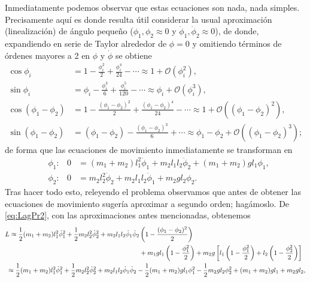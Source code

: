 \documentclass{article}
\begin{document}
Inmediatamente podemos observar que estas ecuaciones son nada, nada simples. Precisamente aqu\'i es donde resulta \'util considerar la usual aproximaci\'on (linealizaci\'on) de \'angulo peque\~no ($\phi_1,\phi_2\approx0$ y $\dot{\phi}_1,\dot{\phi}_2\approx0$), de donde, expandiendo en serie de Taylor alrededor de $\phi=0$ y omitiendo t\'erminos de \'ordenes mayores a 2 en $\phi$ y $\dot{\phi}$ se obtiene
\begin{align}
    \cos\phi_i &= 1-\frac{\phi^2_i}{2}+\frac{\phi^4_i}{24}-\cdots \approx 1 + \mathcal{O}(\phi_i^2), \nonumber \\
    \sin\phi_i &= \phi_i-\frac{\phi_i^3}{6}+\frac{\phi_i^5}{120}-\cdots \approx \phi_i + \mathcal{O}(\phi_i^3), \nonumber \\
    \cos(\phi_1-\phi_2)&=1-\frac{(\phi_1-\phi_2)^2}{2} + \frac{(\phi_1-\phi_2)^4}{24} - \cdots \approx 1 + \mathcal{O}((\phi_1-\phi_2)^2), \nonumber \\
    \sin(\phi_1-\phi_2)&=(\phi_1-\phi_2)-\frac{(\phi_1-\phi_2)^3}{6}+\cdots\approx\phi_1-\phi_2 + \mathcal{O}((\phi_1-\phi_2)^3); \nonumber
\end{align}
de forma que las ecuaciones de movimiento inmediatamente se transforman en
\begin{align}
    &\phi_1:& 0&=(m_1+m_2)l_1^2\ddot{\phi}_1 + m_2l_1l_2\ddot{\phi}_2 +(m_1+m_2)gl_1\phi_1, \label{Pr2:phi1}\\
    &\phi_2:& 0&=m_2l_2^2\ddot{\phi}_2 + m_2l_1l_2\ddot{\phi}_1 + m_2gl_2\phi_2. \label{Pr2:phi2}
\end{align}
Tras hacer todo esto, releyendo el problema observamos que antes de obtener las ecuaciones de movimiento suger\'ia aproximar a segundo orden; hag\'amoslo. De \eqref{eq:LagPr2}, con las aproximaciones antes mencionadas, obtenemos
\begin{align}
    L \approx \frac{1}{2}(m_1+m_2)l_1^2\dot{\phi}_1^2 + \frac{1}{2}m_2l_2^2\dot{\phi}^2_2 + m_2l_1l_2\dot{\phi}_1\dot{\phi}_2 &\left(1-\frac{(\phi_1-\phi_2)^2}{2}\right) \nonumber \\
    &+ m_1gl_1\left(1-\frac{\phi_1^2}{2}\right) + m_2g\left[l_1\left(1-\frac{\phi_1^2}{2}\right)+l_2\left(1-\frac{\phi_2^2}{2}\right)\right] \nonumber \\
    &\hspace{-7.1cm} \approx \frac{1}{2}(m_1+m_2)l_1^2\dot{\phi}_1^2 + \frac{1}{2}m_2l_2^2\dot{\phi}^2_2 + m_2l_1l_2\dot{\phi}_1\dot{\phi}_2 - \frac{1}{2}(m_1+m_2)gl_1\phi_1^2 - \frac{1}{2}m_2gl_2\phi^2_2 + (m_1+m_2)gl_1+m_2gl_2, \nonumber
\end{align}
\end{document}
